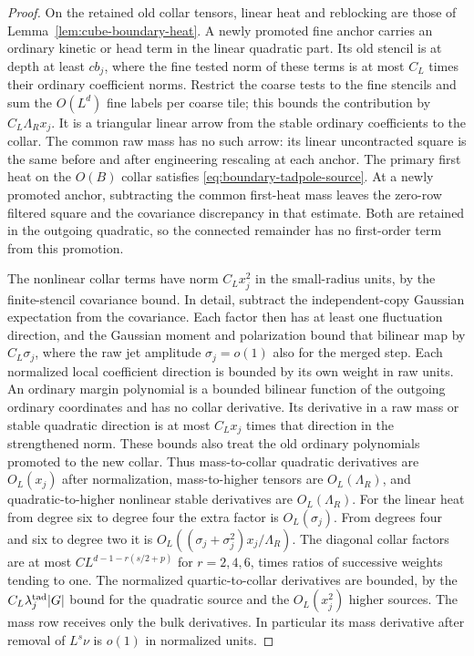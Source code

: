 \documentclass[11pt]{article}
\theoremstyle{definition}
\begin{document}
\begin{proof}
On the retained old collar tensors, linear heat and reblocking
are those of Lemma~\ref{lem:cube-boundary-heat}. A newly promoted
fine anchor carries an ordinary kinetic or head term in the
linear quadratic part. Its old stencil is at depth at least
\(c b_j\), where the fine tested norm of these terms is at most
\(C_L\) times their ordinary coefficient norms. Restrict the
coarse tests to the fine stencils and sum the \(O(L^d)\) fine
labels per coarse tile; this bounds the contribution by
\(C_L\Lambda_R x_j\). It is a triangular linear arrow from
the stable ordinary coefficients to the collar. The common raw
mass has no such arrow: its linear uncontracted square is the same
before and after engineering rescaling at each anchor. The
primary first heat on the \(O(B)\) collar satisfies
\eqref{eq:boundary-tadpole-source}. At a newly promoted anchor,
subtracting the common first-heat mass leaves the zero-row
filtered square and the covariance discrepancy in that estimate.
Both are retained in the outgoing quadratic, so the connected
remainder has no first-order term from this promotion.

The nonlinear collar terms have norm \(C_L x_j^2\) in the
small-radius units, by the finite-stencil covariance bound.
In detail, subtract the independent-copy Gaussian expectation
from the covariance. Each factor then has at least one fluctuation
direction, and the Gaussian moment and polarization bound that
bilinear map by \(C_L\sigma_j\), where the raw jet amplitude
\(\sigma_j=o(1)\) also for the merged step. Each normalized local
coefficient direction is bounded by its own weight in raw units.
An ordinary margin polynomial is a bounded bilinear function
of the outgoing ordinary coordinates and has no collar derivative.
Its derivative in a raw mass or stable quadratic direction is
at most \(C_Lx_j\) times that direction in the strengthened norm.
These bounds also treat the old ordinary polynomials promoted to
the new collar. Thus mass-to-collar quadratic derivatives are
\(O_L(x_j)\) after normalization, mass-to-higher tensors are
\(O_L(\Lambda_R)\), and quadratic-to-higher nonlinear stable
derivatives are \(O_L(\Lambda_R)\).
For the linear heat from degree six to degree four the extra
factor is \(O_L(\sigma_j)\). From degrees four and six to degree
two it is \(O_L((\sigma_j+\sigma_j^2)x_j/\Lambda_R)\).
The diagonal collar factors are at most
\(C L^{d-1-r(s/2+p)}\) for \(r=2,4,6\), times ratios of
successive weights tending to one. The normalized quartic-to-collar
derivatives are bounded, by the \(C_L\lambda_j^{\rm tad}|G|\)
bound for the quadratic source and the \(O_L(x_j^2)\) higher
sources. The mass row receives only the bulk derivatives.
In particular its mass derivative after removal of \(L^s\nu\)
is \(o(1)\) in normalized units.


\end{proof}
\end{document}
